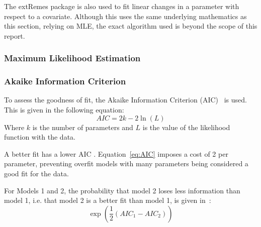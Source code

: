 The extRemes package is also used to fit linear changes in a parameter with respect to a covariate.
Although this uses the same underlying mathematics as this section,
    relying on MLE,
    the exact algorithm used is beyond the scope of this report.

\subsubsection{Maximum Likelihood Estimation}

\subsubsection{Akaike Information Criterion}

To assess the goodness of fit,
    the Akaike Information Criterion (AIC)~\cite{AIC_1974} is used.
This is given in the following equation:
\begin{equation}\label{eq:AIC}
    AIC = 2k - 2\ln \left( L \right)
\end{equation}
Where $k$ is the number of parameters and $L$ is the value of the likelihood function with the data.

A better fit has a lower AIC .
Equation~\ref{eq:AIC} imposes a cost of 2 per parameter,
    preventing overfit models with many parameters being considered a good fit for the data.

For Models 1 and 2, the probability that model 2 loses less information than model 1,
    i.e. that model 2 is a better fit than model 1,
    is given in~\cite{AIC_Info}:
\begin{equation}\label{eq:AIC_Info}
    \exp \left( \frac{1}{2} \left( AIC_1 - AIC_2 \right) \right)
\end{equation}
